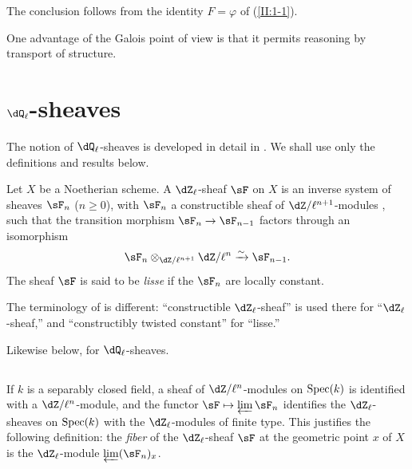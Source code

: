 The conclusion follows from the identity $F=\varphi$ of (\ref{II:1-1}).

One advantage of the Galois point of view is that it permits reasoning by
transport of structure.










\section{\texorpdfstring{$\dQ_\ell$}{Ql}-sheaves}\label{II:2}

The notion of $\dQ_\ell$-sheaves is developed in detail in
\cite[V,VI]{sga5}. We shall use only the definitions and results below.






\begin{definition_}\label{II:2-1}
Let $X$ be a Noetherian scheme. A $\dZ_\ell$-sheaf $\sF$ on $X$ is an
inverse system of sheaves $\sF_n$ ($n\geqslant 0$), with $\sF_n$ a
constructible sheaf of $\dZ/\ell^{n+1}$-modules \cite[IX.2]{sga4}, such that
the transition morphism $\sF_n\to\sF_{n-1}$ factors through an isomorphism
\[
  \sF_n\otimes_{\dZ/\ell^{n+1}} \dZ/\ell^n \iso \sF_{n-1}\text{.}
\]
The sheaf $\sF$ is said to be \emph{lisse} if the $\sF_n$ are locally
constant.
\end{definition_}

The terminology of \cite{sga5} is different: ``constructible
$\dZ_\ell$-sheaf'' is used there for ``$\dZ_\ell$-sheaf,'' and
``constructibly twisted constant'' for ``lisse.''

Likewise below, for $\dQ_\ell$-sheaves.






\subsection{}\label{II:2-2}

If $k$ is a separably closed field, a sheaf of $\dZ/\ell^n$-modules on
$\operatorname{Spec}(k)$ is identified with a $\dZ/\ell^n$-module, and the functor
$\sF\mapsto \varprojlim \sF_n$ identifies the $\dZ_\ell$-sheaves on
$\operatorname{Spec}(k)$ with the $\dZ_\ell$-modules of finite type. This justifies the
following definition: the \emph{fiber} of the $\dZ_\ell$-sheaf $\sF$ at the
geometric point $x$ of $X$ is the $\dZ_\ell$-module
$\varprojlim (\sF_n)_x$.






